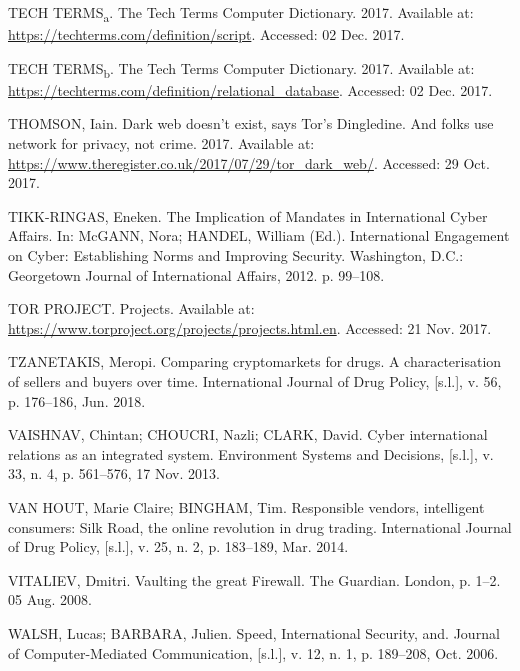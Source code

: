 \begin{list}{}{\setlength{\leftmargin}{0pt}\setlength{\itemsep}{6pt}\setlength{\parsep}{0pt}}
\item TECH TERMS\textsubscript{a}. The Tech Terms Computer Dictionary. 2017. Available at: \url{https://techterms.com/definition/script}. Accessed: 02 Dec. 2017.

\item TECH TERMS\textsubscript{b}. The Tech Terms Computer Dictionary. 2017. Available at: \url{https://techterms.com/definition/relational_database}. Accessed: 02 Dec. 2017.

\item THOMSON, Iain. Dark web doesn't exist, says Tor's Dingledine. And folks use network for privacy, not crime. 2017. Available at: \url{https://www.theregister.co.uk/2017/07/29/tor_dark_web/}. Accessed: 29 Oct. 2017.

\item TIKK-RINGAS, Eneken. The Implication of Mandates in International Cyber Affairs. In: McGANN, Nora; HANDEL, William (Ed.). International Engagement on Cyber: Establishing Norms and Improving Security. Washington, D.C.: Georgetown Journal of International Affairs, 2012. p. 99--108.

\item TOR PROJECT. Projects. Available at: \url{https://www.torproject.org/projects/projects.html.en}. Accessed: 21 Nov. 2017.

\item TZANETAKIS, Meropi. Comparing cryptomarkets for drugs. A characterisation of sellers and buyers over time. International Journal of Drug Policy, [s.l.], v. 56, p. 176--186, Jun. 2018.

\item VAISHNAV, Chintan; CHOUCRI, Nazli; CLARK, David. Cyber international relations as an integrated system. Environment Systems and Decisions, [s.l.], v. 33, n. 4, p. 561--576, 17 Nov. 2013.

\item VAN HOUT, Marie Claire; BINGHAM, Tim. Responsible vendors, intelligent consumers: Silk Road, the online revolution in drug trading. International Journal of Drug Policy, [s.l.], v. 25, n. 2, p. 183--189, Mar. 2014.

\item VITALIEV, Dmitri. Vaulting the great Firewall. The Guardian. London, p. 1--2. 05 Aug. 2008.

\item WALSH, Lucas; BARBARA, Julien. Speed, International Security, and. Journal of Computer-Mediated Communication, [s.l.], v. 12, n. 1, p. 189--208, Oct. 2006.


\end{list}

